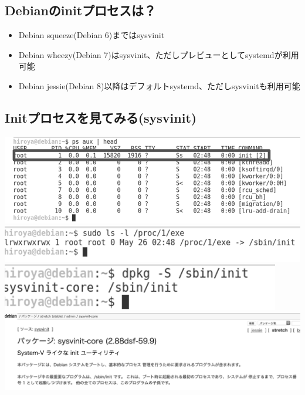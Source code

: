 \documentclass[mingoth,a4paper]{jsarticle}
\begin{document}
\subsection{Debianのinitプロセスは？}
\begin{itemize}
 \item Debian squeeze(Debian 6)まではsysvinit
 \item Debian wheezy(Debian 7)はsysvinit、ただしプレビューとしてsystemdが利用可能
 \item Debian jessie(Debian 8)以降はデフォルトsystemd、ただしsysvinitも利用可能
\end{itemize}

\subsection{Initプロセスを見てみる(sysvinit)}
\begin{flushleft}
\includegraphics[keepaspectratio,width=0.5\hsize]{image201905-kansai/init01_gray.png}
 \\
  \includegraphics[keepaspectratio,width=0.5\hsize]{image201905-kansai/init02_gray.png}
 \\
  \includegraphics[keepaspectratio,width=0.3\hsize]{image201905-kansai/init03_gray.png}
 \\
\includegraphics[keepaspectratio,width=0.7\hsize]{image201905-kansai/init04_gray.png}
\end{flushleft}
\end{document}
